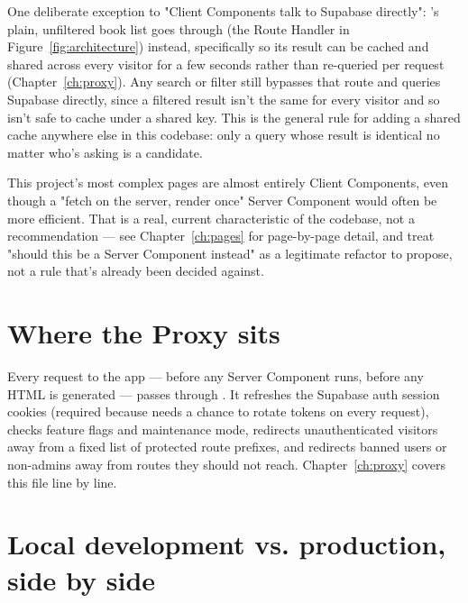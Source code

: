 \begin{olknote}
One deliberate exception to "Client Components talk to Supabase directly": 's plain, unfiltered book list goes through  (the Route Handler in Figure~\ref{fig:architecture}) instead, specifically so its result can be cached and shared across every visitor for a few seconds rather than re-queried per request (Chapter~\ref{ch:proxy}). Any search or filter still bypasses that route and queries Supabase directly, since a filtered result isn't the same for every visitor and so isn't safe to cache under a shared key. This is the general rule for adding a shared cache anywhere else in this codebase: only a query whose result is identical no matter who's asking is a candidate.
\end{olknote}

\begin{olknote}
This project's most complex pages are almost entirely Client Components, even though a "fetch on the server, render once" Server Component would often be more efficient. That is a real, current characteristic of the codebase, not a recommendation — see Chapter~\ref{ch:pages} for page-by-page detail, and treat "should this be a Server Component instead" as a legitimate refactor to propose, not a rule that's already been decided against.
\end{olknote}

\section{Where the Proxy sits}

Every request to the app — before any Server Component runs, before any HTML is generated — passes through . It refreshes the Supabase auth session cookies (required because  needs a chance to rotate tokens on every request), checks  feature flags and maintenance mode, redirects unauthenticated visitors away from a fixed list of protected route prefixes, and redirects banned users or non-admins away from routes they should not reach. Chapter~\ref{ch:proxy} covers this file line by line.

\section{Local development vs. production, side by side}

